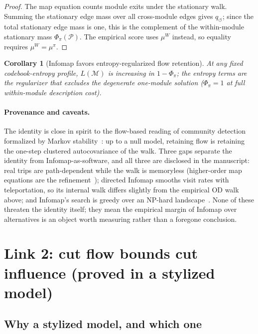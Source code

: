 \documentclass[11pt]{article}
\newtheorem{corollary}[theorem]{Corollary}
\theoremstyle{definition}
\theoremstyle{remark}
\begin{document}
\begin{proof}
    The map equation counts module exits under the stationary walk.
    Summing the stationary edge mass over all cross-module edges gives
    $q_{\circlearrowleft}$; since the total stationary edge mass is one, this
    is the complement of the within-module stationary mass
    $\Phi_\pi(\mathcal{P})$.
    The empirical score uses $\mu^W$ instead, so equality requires
    $\mu^W=\mu^\pi$.
\end{proof}

\begin{corollary}[Infomap favors entropy-regularized flow retention]
    At any fixed codebook-entropy profile, $L(\mathcal{M})$ is increasing in
    $1 - \Phi_\pi$; the entropy terms are the regularizer that excludes the
    degenerate one-module solution ($\Phi_\pi = 1$ at full within-module
    description cost).
\end{corollary}

\paragraph{Provenance and caveats.}
The identity is close in spirit to the flow-based reading of community
detection formalized by Markov
stability~\citep{delvenne2010stability,lambiotte2014multiscale}: up to a null
model, retaining flow is retaining the one-step clustered autocovariance of
the walk.
Three gaps separate the identity from Infomap-as-software, and all three are
disclosed in the manuscript: real trips are path-dependent while the walk is
memoryless (higher-order map equations are the
refinement~\citep{rosvall2014memory}); directed Infomap smooths visit rates
with teleportation, so its internal walk differs slightly from the empirical
OD walk above; and Infomap's search is greedy over an NP-hard
landscape~\citep{edler2023community}.
None of these threaten the identity itself; they mean the empirical margin of
Infomap over alternatives is an object worth measuring rather than a
foregone conclusion.

\section{Link 2: cut flow bounds cut influence (proved in a stylized model)}
\label{sec:link2}

\subsection{Why a stylized model, and which one}
\label{sec:whymodel}
\end{document}
